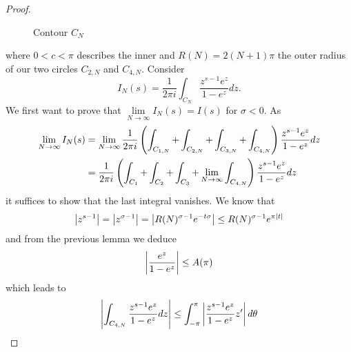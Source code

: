 \begin{proof}
\begin{figure}[!htb]
\begin{minipage}[c]{0.45\textwidth}
\end{minipage}
\caption{Contour $C_N$}
\label{fig:ContourCN}
\end{figure}
	where $0 < c < \pi$ describes the inner and $R(N) = 2(N + 1) \pi$ the outer radius of our two circles $C_{2,N}$ and $C_{4,N}$. Consider
\begin{equation*}
	I_N(s) = \frac{1}{2 \pi i} \int _{C_N} \frac{z^{s - 1} e^z}{1 - e^z} dz.
\end{equation*}
	We first want to prove that $\lim\limits_{N \to \infty} I_N(s) = I(s)$ for $\sigma < 0$. As
\begin{equation*}
\begin{aligned}
	\lim\limits_{N \to \infty} I_N(s)
		&= \lim\limits_{N \to \infty} \frac{1}{2 \pi i} \left(\int_{C_{1,N}} + \int_{C_{2,N}} + \int_{C_{3,N}} + \int_{C_{4,N}}\right) \frac{z^{s - 1} e^z}{1 - e^z} dz \\
		&= \frac{1}{2 \pi i} \left(\int_{C_{1}} + \int_{C_{2}} + \int_{C_{3}} + \lim\limits_{N \to \infty}\int_{C_{4,N}}\right) \frac{z^{s - 1} e^z}{1 - e^z} dz
\end{aligned}
\end{equation*}
	it suffices to show that the last integral vanishes. We know that
\begin{equation*}
	\left|z^{s - 1}\right| = \left|z^{\sigma - 1}\right| = \left|R(N)^{\sigma - 1} e^{-t \sigma}\right| \leq R(N)^{\sigma -1} e^{\pi \left|t\right|}
\end{equation*}
	and from the previous lemma we deduce
\begin{equation*}
	\left|\frac{e^z}{1 - e^z}\right| \leq A(\pi)
\end{equation*}
	which leads to
\begin{equation*}
\begin{aligned}	
	\abs{\int_{C_{4,N}} \frac{z^{s - 1} e^z}{1 - e^z} dz}
	&\leq \int_{-\pi}^{\pi} \abs{\frac{z^{s - 1} e^z}{1 - e^z} z^\prime} d\theta \\

\end{aligned}
\end{equation*}
\end{proof}
